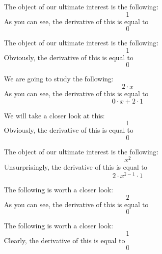 \documentclass{article}
\begin{document}
The object of our ultimate interest is the following:
\begin{equation}
1 
\end{equation}
As you can see, the derivative of this is equal to
\begin{equation}
0 
\end{equation}

The object of our ultimate interest is the following:
\begin{equation}
1 
\end{equation}
Obviously, the derivative of this is equal to
\begin{equation}
0 
\end{equation}

We are going to study the following:
\begin{equation}
2 \cdot x 
\end{equation}
As you can see, the derivative of this is equal to
\begin{equation}
0 \cdot x + 2 \cdot 1 
\end{equation}

We will take a closer look at this:
\begin{equation}
1 
\end{equation}
Obviously, the derivative of this is equal to
\begin{equation}
0 
\end{equation}

The object of our ultimate interest is the following:
\begin{equation}
x ^{2 } 
\end{equation}
Unsurprisingly, the derivative of this is equal to
\begin{equation}
2 \cdot x ^{2 - 1 } \cdot 1 
\end{equation}

The following is worth a closer look:
\begin{equation}
2 
\end{equation}
As you can see, the derivative of this is equal to
\begin{equation}
0 
\end{equation}

The following is worth a closer look:
\begin{equation}
1 
\end{equation}
Clearly, the derivative of this is equal to
\begin{equation}
0 
\end{equation}
\end{document}
